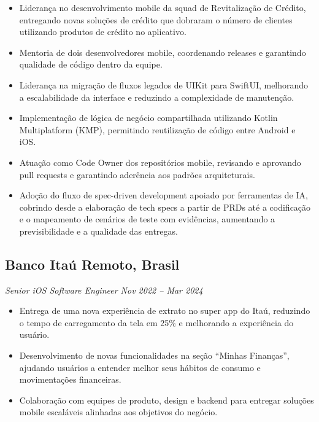 \documentclass[a4paper,10pt]{article}
\begin{document}
\begin{itemize}

\item Liderança no desenvolvimento mobile da squad de Revitalização de Crédito, entregando novas soluções de crédito que dobraram o número de clientes utilizando produtos de crédito no aplicativo.

\item Mentoria de dois desenvolvedores mobile, coordenando releases e garantindo qualidade de código dentro da equipe.

\item Liderança na migração de fluxos legados de UIKit para SwiftUI, melhorando a escalabilidade da interface e reduzindo a complexidade de manutenção.

\item Implementação de lógica de negócio compartilhada utilizando Kotlin Multiplatform (KMP), permitindo reutilização de código entre Android e iOS.

\item Atuação como Code Owner dos repositórios mobile, revisando e aprovando pull requests e garantindo aderência aos padrões arquiteturais.

\item Adoção do fluxo de spec-driven development apoiado por ferramentas de IA, cobrindo desde a elaboração de tech specs a partir de PRDs até a codificação e o mapeamento de cenários de teste com evidências, aumentando a previsibilidade e a qualidade das entregas.

\end{itemize}

\subsection*{\textbf{Banco Itaú} \hfill Remoto, Brasil}
\textit{Senior iOS Software Engineer \hfill Nov 2022 – Mar 2024}

\begin{itemize}

\item Entrega de uma nova experiência de extrato no super app do Itaú, reduzindo o tempo de carregamento da tela em 25\% e melhorando a experiência do usuário.

\item Desenvolvimento de novas funcionalidades na seção ``Minhas Finanças'', ajudando usuários a entender melhor seus hábitos de consumo e movimentações financeiras.

\item Colaboração com equipes de produto, design e backend para entregar soluções mobile escaláveis alinhadas aos objetivos do negócio.

\end{itemize}
\end{document}
